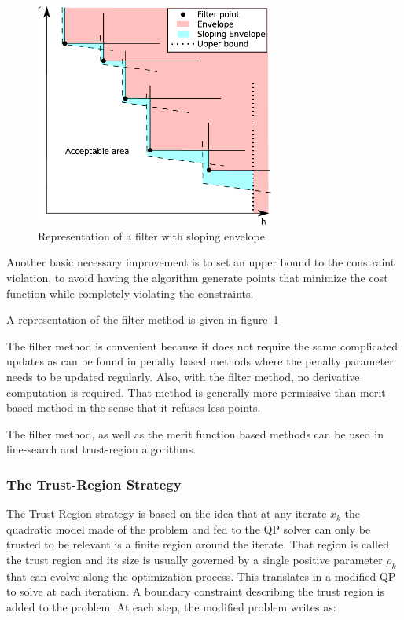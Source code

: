 \begin{figure}
  \centering
  \includegraphics[width=0.7\textwidth]{filter.pdf}
  \caption{Representation of a filter with sloping envelope}
\label{fig:Filter}
\end{figure}

Another basic necessary improvement is to set an upper bound to the constraint violation, to avoid having the algorithm generate points that minimize the cost function while completely violating the constraints.

A representation of the filter method is given in figure~\ref{fig:Filter}

The filter method is convenient because it does not require the same complicated updates as can be found in penalty based methods where the penalty parameter needs to be updated regularly.
Also, with the filter method, no derivative computation is required.
That method is generally more permissive than merit based method in the sense that it refuses less points.

The filter method, as well as the merit function based methods can be used in line-search and trust-region algorithms.

\subsubsection{The Trust-Region Strategy}
\label{ssub:the_trust_region_strategy}
The Trust Region strategy is based on the idea that at any iterate $x_k$ the quadratic model made of the problem and fed to the QP solver can only be trusted to be relevant is a finite region around the iterate.
That region is called the trust region and its size is usually governed by a single positive parameter $\rho_k$ that can evolve along the optimization process.
This translates in a modified QP to solve at each iteration.
A boundary constraint describing the trust region is added to the problem.
At each step, the modified problem writes as:

